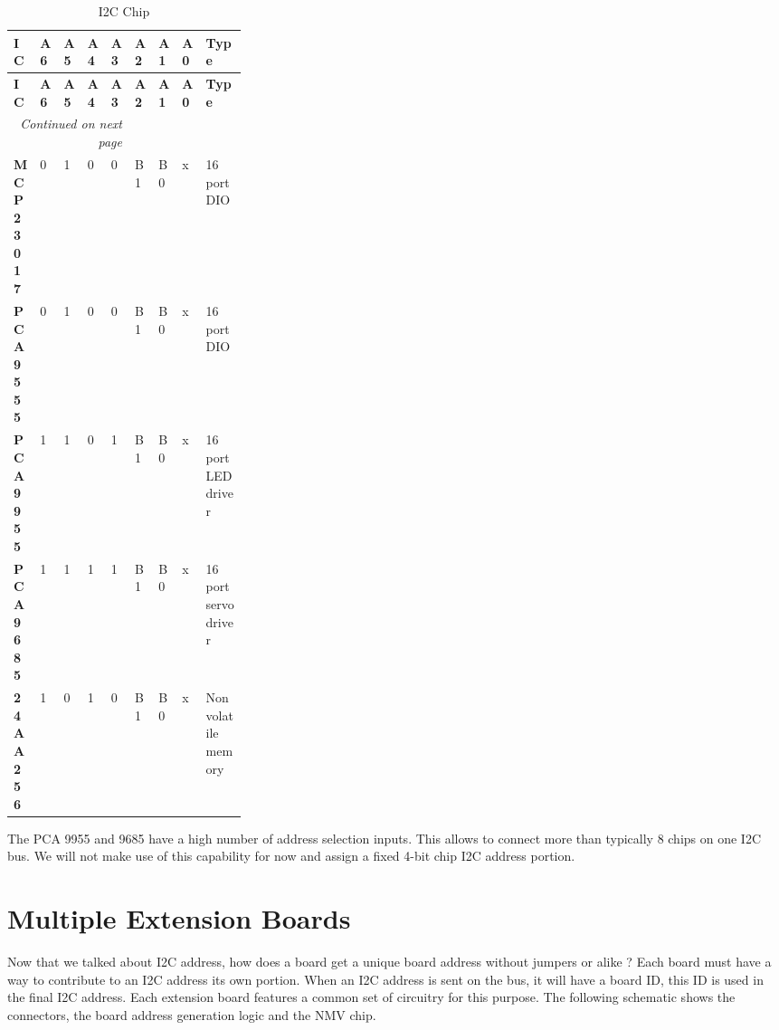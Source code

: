 \begin{longtable}{@{}|l|l|l|l|l|l|l|l|p{0.3\linewidth}|@{}}
    \caption{I2C Chip} \\
    \toprule
    \textbf{IC} & \textbf{A6} & \textbf{A5} & \textbf{A4} & \textbf{A3} & \textbf{A2} & \textbf{A1} & \textbf{A0} & \textbf{Type} \\
    \midrule
    \endfirsthead
    \toprule
    \textbf{IC} & \textbf{A6} & \textbf{A5} & \textbf{A4} & \textbf{A3} & \textbf{A2} & \textbf{A1} & \textbf{A0} & \textbf{Type} \\
    \midrule
    \endhead
    \midrule
    \multicolumn{5}{r}{\textit{Continued on next page}} \\
    \midrule
    \endfoot
    \bottomrule
    \endlastfoot
    \textbf{MCP23017} & 0 & 1 & 0 & 0 & B1 & B0 & x & 16 port DIO \\
    \midrule
    \textbf{PCA9555} & 0 & 1 & 0 & 0 & B1 & B0 & x & 16 port DIO \\
    \midrule
    \textbf{PCA9955} & 1 & 1 & 0 & 1 & B1 & B0 & x & 16 port LED driver \\
    \midrule
    \textbf{PCA9685} & 1 & 1 & 1 & 1 & B1 & B0 & x & 16 port servo driver \\
    \midrule
    \textbf{24AA256} & 1 & 0 & 1 & 0 & B1 & B0 & x & Non volatile memory \\
\end{longtable}%

The PCA 9955 and 9685 have a high number of address selection inputs. This allows to connect more than typically 8 chips on one I2C bus. We will not make use of this capability for now and assign a fixed 4-bit chip I2C address portion.

\section{Multiple Extension Boards}

Now that we talked about I2C address, how does a board get a unique board address without jumpers or alike ? Each board must have a way to contribute to an I2C address its own portion. When an I2C address is sent on the bus, it will have a board ID, this ID is used in the final I2C address. Each extension board features a common set of circuitry for this purpose. The following schematic shows the connectors, the board address generation logic and the NMV chip.


